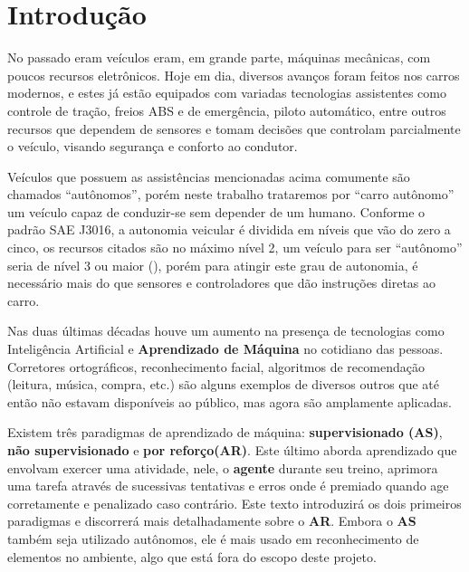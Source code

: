 
\chapter*[Introdução]{Introdução}

No passado eram veículos eram, em grande parte, máquinas mecânicas, com poucos recursos eletrônicos. Hoje em dia, diversos avanços foram feitos nos carros modernos, e estes já estão equipados com variadas tecnologias assistentes como controle de tração, freios ABS e de emergência, piloto automático, entre outros recursos que dependem de sensores e tomam decisões que controlam parcialmente o veículo, visando segurança e conforto ao condutor. 

Veículos que possuem as assistências mencionadas acima comumente são chamados ``autônomos'', porém neste trabalho trataremos por ``carro autônomo'' um veículo capaz de conduzir-se sem depender de um humano. Conforme o padrão SAE J3016, a autonomia veicular é dividida em níveis que vão do zero a cinco, os recursos citados são no máximo nível 2, um veículo para ser ``autônomo'' seria de nível 3 ou maior (), porém para atingir este grau de autonomia, é necessário mais do que sensores e controladores que dão instruções diretas ao carro.

Nas duas últimas décadas houve um aumento na presença de tecnologias como Inteligência Artificial e \textbf{Aprendizado de Máquina} no cotidiano das pessoas. Corretores ortográficos, reconhecimento facial, algoritmos de recomendação (leitura, música, compra, etc.) são alguns exemplos de diversos outros que até então não estavam disponíveis ao público, mas agora são amplamente aplicadas. 

Existem três paradigmas de aprendizado de máquina: \textbf{supervisionado (AS)}, \textbf{não supervisionado} e \textbf{por reforço(AR)}. Este último aborda aprendizado que envolvam exercer uma atividade, nele, o \textbf{agente} durante seu treino, aprimora uma tarefa através de sucessivas tentativas e erros onde é premiado quando age corretamente e penalizado caso contrário. Este texto introduzirá os dois primeiros paradigmas e discorrerá mais detalhadamente sobre o \textbf{AR}. Embora o \textbf{AS} também seja utilizado autônomos, ele é mais usado em reconhecimento de elementos no ambiente, algo que está fora do escopo deste projeto.

